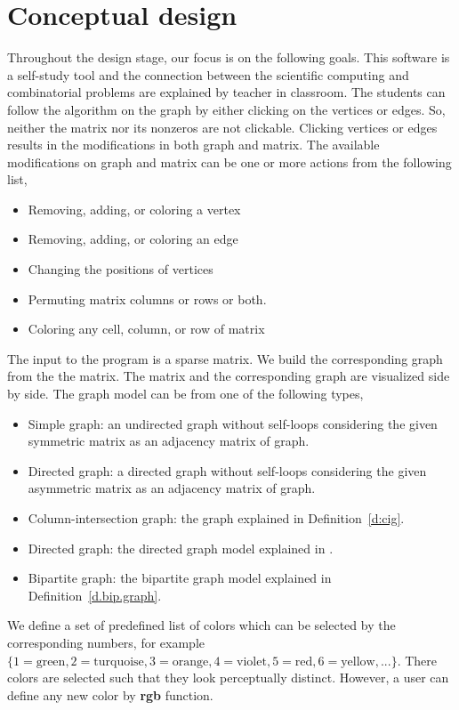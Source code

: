 \documentclass[12pt, twoside,a4paper,toc=bibliography]{scrbook}
\newcommand{\defref}[1]{Definition~\protect\ref{#1}}
\begin{document}
\section{Conceptual design}
\label{s.concept}
Throughout the design stage, our focus is on the following goals.
This software is a self-study tool and the connection between the scientific computing
and combinatorial problems are explained by teacher in classroom.
The students can follow the algorithm on the graph by either
clicking on the vertices or edges.
So, neither the matrix nor its nonzeros are not clickable.
Clicking vertices or edges results in the modifications in both graph and matrix.
The available modifications on graph and matrix can be one or more actions
from the following list,
\begin{itemize}
\item Removing, adding, or coloring a vertex
\item Removing, adding, or coloring an edge
\item Changing the positions of vertices
\item Permuting matrix columns or rows or both.
\item Coloring any cell, column, or row of matrix
\end{itemize}

The input to the program is a sparse matrix. 
We build the corresponding graph from the the matrix.
The matrix and the corresponding graph are visualized side by side.
The graph model can be from one of the following types,
\begin{itemize}
\item Simple graph: an undirected graph without self-loops considering 
the given symmetric matrix as an adjacency matrix of graph.
\item Directed graph: a directed graph without self-loops considering
the given asymmetric matrix as an adjacency matrix of graph.
\item Column-intersection graph: the graph explained in \defref{d:cig}.
\item Directed graph: the directed graph model explained in \cite{Gebremedhin05whatcolor}.
\item Bipartite graph: the bipartite graph model explained in \defref{d.bip.graph}.
\end{itemize}

We define a set of predefined list of colors which can be selected by
the corresponding numbers, for example
$\{1=\text{green}, 2=\text{turquoise}, 3=\text{orange}, 4=\text{violet},
5=\text{red}, 6=\text{yellow}, ...\}$.
There colors are selected such that they look perceptually distinct.
However, a user can define any new color by \textbf{rgb} function.
\end{document}
